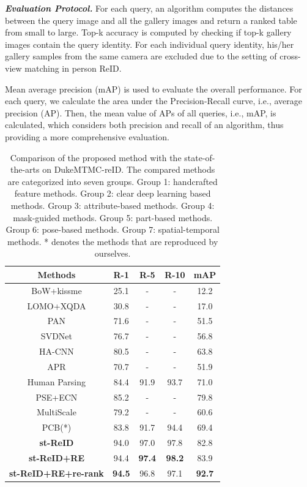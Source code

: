 \documentclass[letterpaper]{article} %
\begin{document}
\textbf{\emph{Evaluation Protocol.}} For each query, an algorithm computes the distances between the query image and all the gallery images and return a ranked table from small to large. Top-k accuracy is computed by checking if top-k gallery images contain the query identity. For each individual query identity, his/her gallery samples from the same camera are excluded due to the setting of cross-view matching in person ReID.

Mean average precision (mAP) is used to evaluate the overall performance. For each query, we calculate the area under the Precision-Recall curve, i.e., average precision (AP). Then, the mean value of APs of all queries, i.e., mAP, is calculated, which considers both precision and recall of an algorithm, thus providing a more comprehensive evaluation.
\begin{table}
\begin{center}
\begin{tabular}{c|c|c|c|c}
\hline
Methods &R-1&R-5&R-10&mAP \\
\hline
BoW+kissme&25.1&-&-&12.2\\
LOMO+XQDA&30.8&-&-&17.0\\
\hline
PAN&71.6&-&-&51.5\\
SVDNet&76.7&-&-&56.8\\
HA-CNN&80.5&-&-&63.8\\
\hline
APR&70.7&-&-&51.9\\
\hline
Human Parsing&84.4&91.9&93.7&71.0\\
\hline
PSE+ECN &85.2&-&-&79.8\\
\hline
MultiScale&79.2&-&-&60.6\\
PCB(*) &83.8&91.7&94.4&69.4\\
\hline
\textbf{st-ReID}&94.0&97.0&97.8&82.8\\
\textbf{st-ReID+RE}&94.4&\textbf{97.4}&\textbf{98.2}&83.9\\
\textbf{st-ReID+RE+re-rank}&\textbf{94.5}&96.8&97.1&\textbf{92.7}\\
\hline
\end{tabular}
\end{center}
\caption{Comparison of the proposed method with the state-of-the-arts on DukeMTMC-reID. The compared methods are categorized into seven groups. Group 1: handcrafted feature methods. Group 2: clear deep learning based methods. Group 3: attribute-based methods. Group 4: mask-guided methods. Group 5: part-based methods. Group 6: pose-based methods. Group 7: spatial-temporal methods. * denotes the methods that are reproduced by ourselves.}\label{tab:duke}
\end{table}
\end{document}
